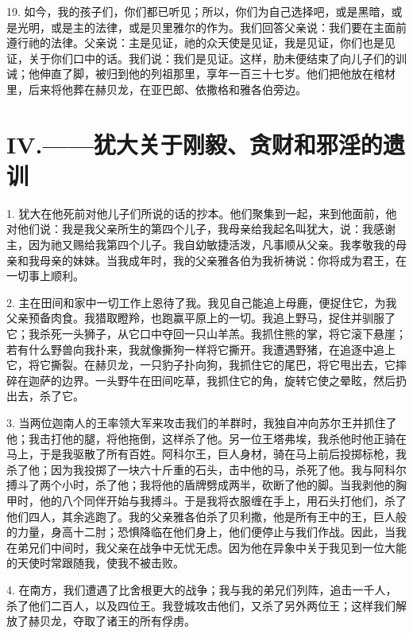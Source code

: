 19. 如今，我的孩子们，你们都已听见；所以，你们为自己选择吧，或是黑暗，或是光明，或是主的法律，或是贝里雅尔的作为。我们回答父亲说：我们要在主面前遵行祂的法律。父亲说：主是见证，祂的众天使是见证，我是见证，你们也是见证，关于你们口中的话。我们说：我们是见证。这样，肋未便结束了向儿子们的训诫；他伸直了脚，被归到他的列祖那里，享年一百三十七岁。他们把他放在棺材里，后来将他葬在赫贝龙，在亚巴郎、依撒格和雅各伯旁边。\par


\section{IV.——犹大关于刚毅、贪财和邪淫的遗训}

1. 犹大在他死前对他儿子们所说的话的抄本。他们聚集到一起，来到他面前，他对他们说：我是我父亲所生的第四个儿子，我母亲给我起名叫犹大，说：我感谢主，因为祂又赐给我第四个儿子。我自幼敏捷活泼，凡事顺从父亲。我孝敬我的母亲和我母亲的妹妹。当我成年时，我的父亲雅各伯为我祈祷说：你将成为君王，在一切事上顺利。\par

2. 主在田间和家中一切工作上恩待了我。我见自己能追上母鹿，便捉住它，为我父亲预备肉食。我猎取瞪羚，也跑赢平原上的一切。我追上野马，捉住并驯服了它；我杀死一头狮子，从它口中夺回一只山羊羔。我抓住熊的掌，将它滚下悬崖；若有什么野兽向我扑来，我就像撕狗一样将它撕开。我遭遇野猪，在追逐中追上它，将它撕裂。在赫贝龙，一只豹子扑向狗，我抓住它的尾巴，将它甩出去，它摔碎在迦萨的边界。一头野牛在田间吃草，我抓住它的角，旋转它使之晕眩，然后扔出去，杀了它。\par

3. 当两位迦南人的王率领大军来攻击我们的羊群时，我独自冲向苏尔王并抓住了他；我击打他的腿，将他拖倒，这样杀了他。另一位王塔弗埃，我杀他时他正骑在马上，于是我驱散了所有百姓。阿科尔王，巨人身材，骑在马上前后投掷标枪，我杀了他；因为我投掷了一块六十斤重的石头，击中他的马，杀死了他。我与阿科尔搏斗了两个小时，杀了他；我将他的盾牌劈成两半，砍断了他的脚。当我剥他的胸甲时，他的八个同伴开始与我搏斗。于是我将衣服缠在手上，用石头打他们，杀了他们四人，其余逃跑了。我的父亲雅各伯杀了贝利撒，他是所有王中的王，巨人般的力量，身高十二肘；恐惧降临在他们身上，他们便停止与我们作战。因此，当我在弟兄们中间时，我父亲在战争中无忧无虑。因为他在异象中关于我见到一位大能的天使时常跟随我，使我不被击败。\par

4. 在南方，我们遭遇了比舍根更大的战争；我与我的弟兄们列阵，追击一千人，杀了他们二百人，以及四位王。我登城攻击他们，又杀了另外两位王；这样我们解放了赫贝龙，夺取了诸王的所有俘虏。\par

